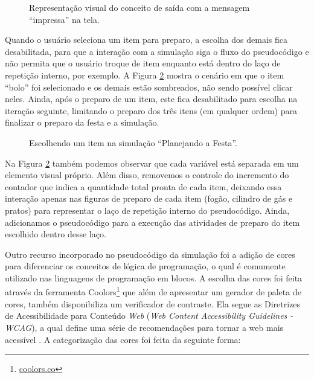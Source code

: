 \begin{figure}[h!]
    \centering
    \setlength{\fboxrule}{0.1pt} %
    \caption{Representação visual do conceito de saída com a mensagem \enquote{impressa} na tela.}
    \label{figure:saida}
\end{figure}

Quando o usuário seleciona um item para preparo, a escolha dos demais fica desabilitada, para que a interação com a simulação siga o fluxo do pseudocódigo e não permita que o usuário troque de item enquanto está dentro do laço de repetição interno, por exemplo. A Figura \ref{figure:item_escolhido} mostra o cenário em que o item \enquote{bolo} foi selecionado e os demais estão sombreados, não sendo possível clicar neles. Ainda, após o preparo de um item, este fica desabilitado para escolha na iteração seguinte, limitando o preparo dos três itens (em qualquer ordem) para finalizar o preparo da festa e a simulação.

\begin{figure}[h!]
    \centering
    \setlength{\fboxrule}{0.1pt} %
    \caption{Escolhendo um item na simulação \enquote{Planejando a Festa}.}
    \label{figure:item_escolhido}
\end{figure}

Na Figura \ref{figure:item_escolhido} também podemos observar que cada variável está separada em um elemento visual próprio. Além disso, removemos o controle do incremento do contador que indica a quantidade total pronta de cada item, deixando essa interação apenas nas figuras de preparo de cada item (fogão, cilindro de gás e pratos) para representar o laço de repetição interno do pseudocódigo. Ainda, adicionamos o pseudocódigo para a execução das atividades de preparo do item escolhido dentro desse laço.

Outro recurso incorporado no pseudocódigo da simulação foi a adição de cores para diferenciar os conceitos de lógica de programação, o qual é comumente utilizado nas linguagens de programação em blocos. A escolha das cores foi feita através da ferramenta Coolors\footnote{\url{coolors.co}} que além de apresentar um gerador de paleta de cores, também disponibiliza um verificador de contraste. Ela segue as Diretrizes de Acessibilidade para Conteúdo \textit{Web} (\textit{Web Content Accessibility Guidelines - WCAG}), a qual define uma série de recomendações para tornar a web mais acessível \citep{caldwell2008web}. A categorização das cores foi feita da seguinte forma:

